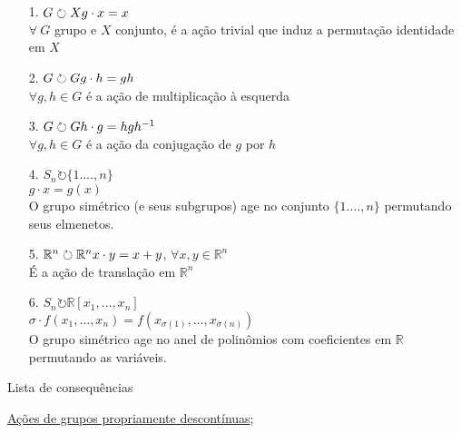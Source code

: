 \begin{ex}\\
\ 
	\begin{itemize}
    
	    \item[1.] $G\circlearrowright X \\
                g\cdot x = x$\\
                $\forall \  G$ grupo e $X$ conjunto, é a ação trivial que induz a permutação identidade em $X$

        \item[2.] $G\circlearrowright G\\
                g\cdot h = gh$\\
                $\forall g,h \in G$ é a ação de multiplicação à esquerda
        
	  \item[3.]  $G\circlearrowright G\\
                h\cdot g = hgh^{-1}$\\
                $\forall g,h \in G$ é a ação da conjugação de $g$ por $h$

        \item[4.] $S_n \circlearrowright \{1.\dots,n\}$\\
                $g\cdot x = g(x)$\\
                O grupo simétrico (e seus subgrupos) age no conjunto $\{1.\dots,n\}$ permutando seus elmenetos.
        
        \item[5.] $\mathbb{R}^n\circlearrowright \mathbb{R}^n\\
                x\cdot y = x+y$, $\forall x,y\in \mathbb{R}^n$\\
                É a ação de translação em $\mathbb{R}^n$

        \item[6.] $S_n \circlearrowright \mathbb{R}[x_1,\dots,x_n]$\\
                $\sigma\cdot f(x_1,\dots,x_n) = f(x_{\sigma(1)},\dots,x_{\sigma(n)})$\\
                O grupo simétrico age no anel de polinômios com coeficientes em $\mathbb{R}$ permutando as variáveis.


    \end{itemize}
\end{ex}
 

\begin{titlemize}{Lista de consequências}
	\item \hyperref[ações-de-grupo-propriamente-descontínuas-def]{Ações de grupos propriamente descontínuas};
\end{titlemize}